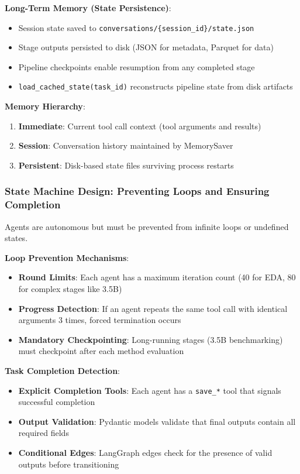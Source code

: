 \documentclass[11pt,a4paper]{article}
\begin{document}
\textbf{Long-Term Memory (State Persistence)}:
\begin{itemize}
    \item Session state saved to \texttt{conversations/\{session\_id\}/state.json}
    \item Stage outputs persisted to disk (JSON for metadata, Parquet for data)
    \item Pipeline checkpoints enable resumption from any completed stage
    \item \texttt{load\_cached\_state(task\_id)} reconstructs pipeline state from disk artifacts
\end{itemize}

\textbf{Memory Hierarchy}:
\begin{enumerate}
    \item \textbf{Immediate}: Current tool call context (tool arguments and results)
    \item \textbf{Session}: Conversation history maintained by MemorySaver
    \item \textbf{Persistent}: Disk-based state files surviving process restarts
\end{enumerate}

\subsubsection{State Machine Design: Preventing Loops and Ensuring Completion}

Agents are autonomous but must be prevented from infinite loops or undefined states.

\textbf{Loop Prevention Mechanisms}:
\begin{itemize}
    \item \textbf{Round Limits}: Each agent has a maximum iteration count (40 for EDA, 80 for complex stages like 3.5B)
    \item \textbf{Progress Detection}: If an agent repeats the same tool call with identical arguments 3 times, forced termination occurs
    \item \textbf{Mandatory Checkpointing}: Long-running stages (3.5B benchmarking) must checkpoint after each method evaluation
\end{itemize}

\textbf{Task Completion Detection}:
\begin{itemize}
    \item \textbf{Explicit Completion Tools}: Each agent has a \texttt{save\_*} tool that signals successful completion
    \item \textbf{Output Validation}: Pydantic models validate that final outputs contain all required fields
    \item \textbf{Conditional Edges}: LangGraph edges check for the presence of valid outputs before transitioning
\end{itemize}
\end{document}
